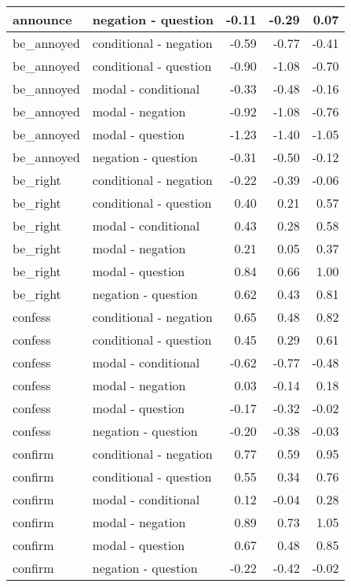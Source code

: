 \documentclass[11pt,fleqn]{article}
\newcommand{\6}{\mbox{$[\hspace*{-.6mm}[$}}
\newcommand{\9}{\mbox{$]\hspace*{-.6mm}]$}}
\begin{document}
\begin{longtable}{llrrr}
      announce & negation - question & -0.11 & -0.29 & 0.07 \\ \midrule
      be\_annoyed & conditional - negation & -0.59 & -0.77 & -0.41 \\ 
      be\_annoyed & conditional - question & -0.90 & -1.08 & -0.70 \\ 
      be\_annoyed & modal - conditional & -0.33 & -0.48 & -0.16 \\ 
      be\_annoyed & modal - negation & -0.92 & -1.08 & -0.76 \\ 
      be\_annoyed & modal - question & -1.23 & -1.40 & -1.05 \\ 
      be\_annoyed & negation - question & -0.31 & -0.50 & -0.12 \\ \midrule
      be\_right & conditional - negation & -0.22 & -0.39 & -0.06 \\ 
      be\_right & conditional - question & 0.40 & 0.21 & 0.57 \\ 
      be\_right & modal - conditional & 0.43 & 0.28 & 0.58 \\ 
      be\_right & modal - negation & 0.21 & 0.05 & 0.37 \\ 
      be\_right & modal - question & 0.84 & 0.66 & 1.00 \\ 
      be\_right & negation - question & 0.62 & 0.43 & 0.81 \\ \midrule
      confess & conditional - negation & 0.65 & 0.48 & 0.82 \\ 
      confess & conditional - question & 0.45 & 0.29 & 0.61 \\ 
      confess & modal - conditional & -0.62 & -0.77 & -0.48 \\ 
      confess & modal - negation & 0.03 & -0.14 & 0.18 \\ 
      confess & modal - question & -0.17 & -0.32 & -0.02 \\ 
      confess & negation - question & -0.20 & -0.38 & -0.03 \\ \midrule
      confirm & conditional - negation & 0.77 & 0.59 & 0.95 \\ 
      confirm & conditional - question & 0.55 & 0.34 & 0.76 \\ 
      confirm & modal - conditional & 0.12 & -0.04 & 0.28 \\ 
      confirm & modal - negation & 0.89 & 0.73 & 1.05 \\ 
      confirm & modal - question & 0.67 & 0.48 & 0.85 \\ 
      confirm & negation - question & -0.22 & -0.42 & -0.02 \\ \midrule


\end{longtable}
\end{document}
